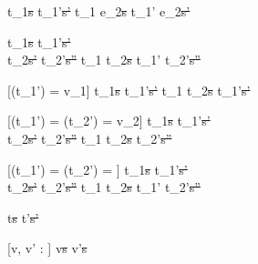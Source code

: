   {t_1\st{s} \normalise t_1'\st{s'}}
  {t_1 \Next e_2\st{s} \normalise t_1' \Next e_2\st{s'}}


  {t_1\st{s}  \normalise t_1'\st{s'} \\
   t_2\st{s'} \normalise t_2'\st{s''}}
  {t_1 \And t_2\st{s} \normalise t_1' \And t_2'\st{s''}}


[\Value(t_1') = v_1]
  {t_1\st{s}  \normalise t_1'\st{s'}}
  {t_1 \Or t_2\st{s} \normalise t_1'\st{s'}}

[\Value(t_1') = \bot \land \Value(t_2') = v_2]
  {t_1\st{s}  \normalise t_1'\st{s'} \\
   t_2\st{s'} \normalise t_2'\st{s''}}
  {t_1 \Or t_2\st{s} \normalise t_2'\st{s''}}

[\Value(t_1') = \bot \land \Value(t_2') = \bot]
  {t_1\st{s}  \normalise t_1'\st{s'} \\
   t_2\st{s'} \normalise t_2'\st{s''}}
  {t_1 \Or t_2\st{s} \normalise t_1' \Or t_2'\st{s''}}












  {t\st{s}  t'\st{s'}}


[v, v' : \beta]
  { }
  {\Edit v\st{s}  \Edit v'\st{s}}

